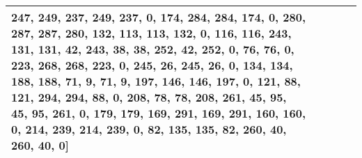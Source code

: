 \documentclass[]{article}
\begin{document}
\begin{table}[!ht]
\begin{tabular}{|m{3.2cm}|>{\centering\arraybackslash}m{2.8cm}|>{\centering\arraybackslash}m{2.8cm}|>{\centering\arraybackslash}m{2.8cm}|>{\centering\arraybackslash}m{2.8cm}|}
247, 249, 237, 249, 237, 0, 174, 284, 284, 174, 0, 280, 287, 287, 280, 132, 113, 113, 132, 0, 116, 116, 243, 131, 131, 42, 243, 38, 38, 252, 42, 252, 0, 76, 76, 0, 223, 268, 268, 223, 0, 245, 26, 245, 26, 0, 134, 134, 188, 188, 71, 9, 71, 9, 197, 146, 146, 197, 0, 121, 88, 121, 294, 294, 88, 0, 208, 78, 78, 208, 261, 45, 95, 45, 95, 261, 0, 179, 179, 169, 291, 169, 291, 160, 160, 0, 214, 239, 214, 239, 0, 82, 135, 135, 82, 260, 40, 260, 40, 0]}\\
		\hline
	\end{tabular}
\end{table}
\end{document}
